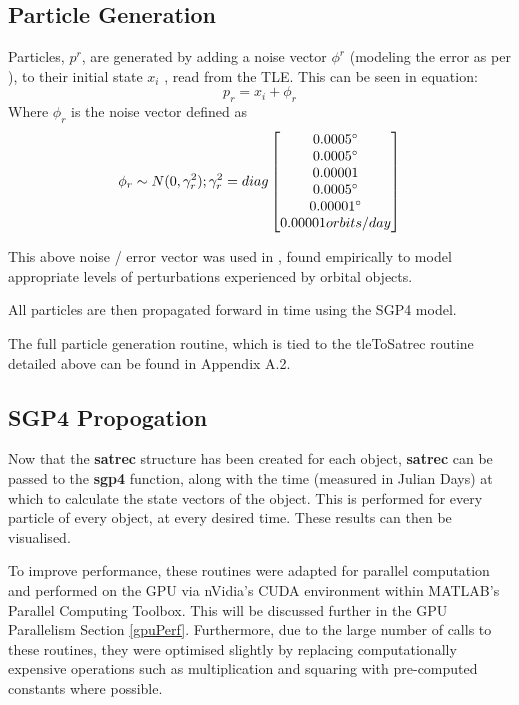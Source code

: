 \documentclass[12pt,openany,a4paper]{book}
\newcommand{\degs}	{\ensuremath{\rm^{\circ}}}
\begin{document}
		\subsection{Particle Generation}
		Particles, $p^r$, are generated by adding a noise vector $\phi^r$ (modeling the error as per \cite{Hobson}), to their  initial state $x_i$ , read from the TLE. This can be seen in equation:
		\begin{equation}
		p_r = x_i + \phi_r 
		\end{equation}
		Where $\phi_r$ is the noise vector defined as
		\begin{equation}
		\phi_r \sim N(0, \gamma_r^2); \gamma_r^2 = diag \begin{bmatrix} 0.0005\degs \\ 0.0005\degs\\ 0.00001\\
		0.0005\degs\\ 0.00001\degs\\ 0.00001 orbits/day \end{bmatrix}
		\end{equation}
		
		This above noise / error vector was used in \cite{Hobson}, found empirically to model appropriate levels of perturbations experienced by orbital objects.
%			


		All particles are then propagated forward in time using the SGP4 model.
		
		The full particle generation routine, which is tied to the tleToSatrec routine detailed above can be found in Appendix A.2.
		\subsection{SGP4 Propogation}
		
		Now that the \textbf{satrec} structure has been created for each object, \textbf{satrec} can be passed to the \textbf{sgp4} function, along with the time (measured in Julian Days) at which to calculate the state vectors of the object. This is performed for every particle of every object, at every desired time. These results can then be visualised. \newline 
		
		To improve performance, these routines were adapted for parallel computation and performed on the GPU via nVidia's CUDA environment within MATLAB's Parallel Computing Toolbox. This will be discussed further in the GPU Parallelism Section \ref{gpuPerf}. Furthermore, due to the large number of calls to these routines, they were optimised slightly by replacing computationally expensive operations such as multiplication and squaring with pre-computed constants where possible. \newline
		
\end{document}
